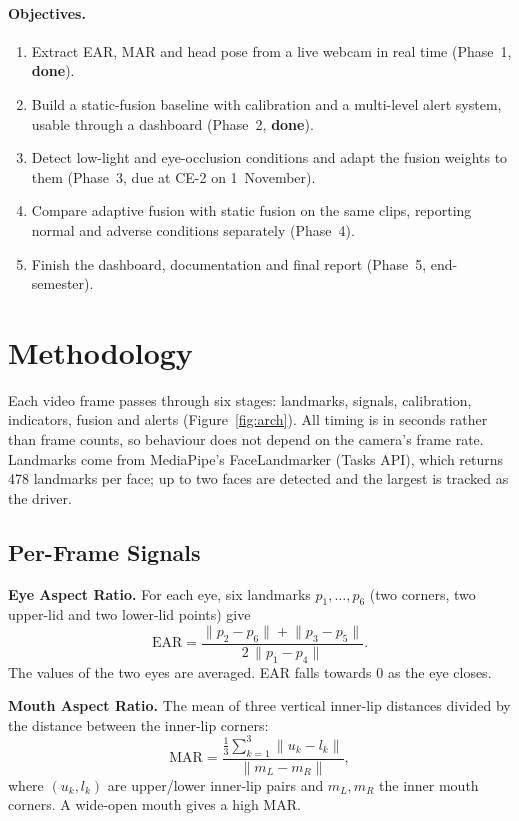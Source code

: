 \documentclass[12pt,a4paper]{article}
\begin{document}
\paragraph{Objectives.}
\begin{enumerate}
\item Extract EAR, MAR and head pose from a live webcam in real time (Phase~1, \textbf{done}).
\item Build a static-fusion baseline with calibration and a multi-level alert system, usable through a dashboard (Phase~2, \textbf{done}).
\item Detect low-light and eye-occlusion conditions and adapt the fusion weights to them (Phase~3, due at CE-2 on 1~November).
\item Compare adaptive fusion with static fusion on the same clips, reporting normal and adverse conditions separately (Phase~4).
\item Finish the dashboard, documentation and final report (Phase~5, end-semester).
\end{enumerate}

\section{Methodology}

Each video frame passes through six stages: landmarks, signals, calibration, indicators, fusion and alerts (Figure~\ref{fig:arch}). All timing is in seconds rather than frame counts, so behaviour does not depend on the camera's frame rate. Landmarks come from MediaPipe's FaceLandmarker (Tasks API), which returns 478 landmarks per face; up to two faces are detected and the largest is tracked as the driver.

\subsection{Per-Frame Signals}

\medskip\noindent\textbf{Eye Aspect Ratio.} For each eye, six landmarks $p_1,\dots,p_6$ (two corners, two upper-lid and two lower-lid points) give
\begin{equation}
\mathrm{EAR} = \frac{\lVert p_2 - p_6 \rVert + \lVert p_3 - p_5 \rVert}{2\,\lVert p_1 - p_4 \rVert}.
\end{equation}
The values of the two eyes are averaged. EAR falls towards 0 as the eye closes.

\medskip\noindent\textbf{Mouth Aspect Ratio.} The mean of three vertical inner-lip distances divided by the distance between the inner-lip corners:
\begin{equation}
\mathrm{MAR} = \frac{\tfrac{1}{3}\sum_{k=1}^{3} \lVert u_k - l_k \rVert}{\lVert m_L - m_R \rVert},
\end{equation}
where $(u_k, l_k)$ are upper/lower inner-lip pairs and $m_L, m_R$ the inner mouth corners. A wide-open mouth gives a high MAR.
\end{document}
